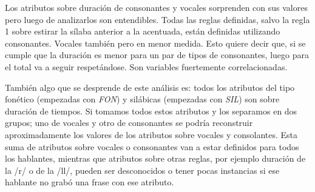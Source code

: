 Los atributos sobre duración de consonantes y vocales sorprenden con sus valores pero luego de analizarlos son entendibles. Todas las reglas definidas, salvo la regla 1 sobre estirar la sílaba anterior a la acentuada, están definidas utilizando consonantes. Vocales también pero en menor medida. Esto quiere decir que, si se cumple que la duración es menor para un par de tipos de consonantes, luego para el total va a seguir respetándose. Son variables fuertemente correlacionadas.

También algo que se desprende de este análisis es: todos los atributos del tipo fonético (empezadas con \textit{FON}) y silábicas (empezadas con \textit{SIL}) son sobre duración de tiempos. Si tomamos todos estos atributos y los separamos en dos grupos; uno de vocales y otro de consonantes se podría reconstruir aproximadamente los valores de los atributos sobre vocales y consolantes. Esta suma de atributos sobre vocales o consonantes van a estar definidos para todos los hablantes, mientras que atributos sobre otras reglas, por ejemplo duración de la /r/ o de la /ll/, pueden ser desconocidos o tener pocas instancias si ese hablante no grabó una frase con ese atributo. 


